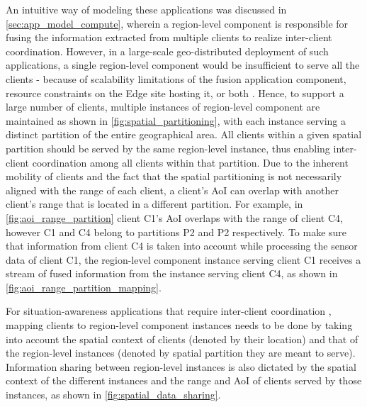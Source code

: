 An intuitive way of modeling these applications was discussed in \cref{sec:app_model_compute}, wherein a region-level component is responsible for fusing the information extracted from multiple clients to realize inter-client coordination. However, in a large-scale geo-distributed deployment of such applications, a single region-level component would be insufficient to serve all the clients - because of scalability limitations of the fusion application component, resource constraints on the Edge site hosting it, or both \cite{talkycars}. Hence, to support a large number of clients, multiple instances of region-level component are maintained as shown in \cref{fig:spatial_partitioning}, with each instance serving a distinct partition of the entire geographical area. All clients within a given spatial partition should be served by the same region-level instance, thus enabling inter-client coordination among all clients within that partition. Due to the inherent mobility of clients and the fact that the spatial partitioning is not necessarily aligned with the range of each client, a client's AoI can overlap with another client's range that is located in a different partition. For example, in \cref{fig:aoi_range_partition} client C1's AoI overlaps with the range of client C4, however C1 and C4 belong to partitions P2 and P2 respectively. To make sure that information from client C4 is taken into account while processing the sensor data of client C1, the region-level component instance serving client C1 receives a stream of fused information from the instance serving client C4, as shown in \cref{fig:aoi_range_partition_mapping}. 

\par For situation-awareness applications that require inter-client coordination , mapping clients to region-level component instances needs to be done by taking into account the spatial context of clients (denoted by their location) and that of the region-level instances (denoted by spatial partition they are meant to serve). Information sharing between region-level instances is also dictated by the spatial context of the different instances and the range and AoI of clients served by those instances, as shown in \cref{fig:spatial_data_sharing}. 

